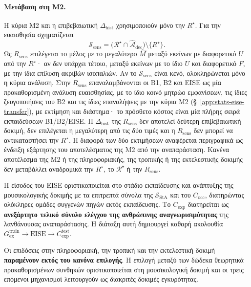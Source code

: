 \documentclass[11pt,a4paper]{article}
\begin{document}
\paragraph{Μετάβαση στη M2.}
Η κύρια M2 και η επιβεβαιωτική \(\Delta_{\mathrm{hist}}\) χρησιμοποιούν μόνο την \(R^\star\). Για την ευαισθησία σχηματίζεται
\[
\mathcal S_{\mathrm{sens}}=\bigl(\mathcal R^\star\cap\widehat{\mathcal A}_{\mathrm{dec}}\bigr)\setminus\{R^\star\}.
\]
Ως \(R_{\mathrm{sens}}\) επιλέγεται το μέλος με το μεγαλύτερο \(\widehat M\) μεταξύ εκείνων με διαφορετικό \(U\) από την \(R^\star\)· αν δεν υπάρχει τέτοιο, μεταξύ εκείνων με το ίδιο \(U\) και διαφορετικό \(F\), με την ίδια επίλυση ακριβών ισοπαλιών. Αν το \(\mathcal S_{\mathrm{sens}}\) είναι κενό, ολοκληρώνεται μόνο η κύρια ανάλυση. Στην \(R_{\mathrm{sens}}\) επαναλαμβάνονται οι B1, B2 και EISE ως μία προκαθορισμένη ανάλυση ευαισθησίας, με το ίδιο κοινό μητρώο εμφανίσεων, τις ίδιες ζευγοποιήσεις του B2 και τις ίδιες επαναλήψεις με την κύρια M2 (§~\ref{app:stats-eise-transfer}), με εκτίμηση και διάστημα· το πρόσθετο κόστος είναι μία πλήρης σειρά εκπαιδεύσεων B1/B2/EISE. Η \(\Delta_{\mathrm{hist}}\) της \(R_{\mathrm{sens}}\) δεν αποτελεί δεύτερη επιβεβαιωτική δοκιμή, δεν επιλέγεται η μεγαλύτερη από τις δύο τιμές και η \(R_{\mathrm{sens}}\) δεν μπορεί να αντικαταστήσει την \(R^\star\). Η διαφορά των δύο εκτιμήσεων αναφέρεται περιγραφικά ως ένδειξη εξάρτησης του αποτελέσματος της M2 από την αναπαράσταση. Κανένα αποτέλεσμα της M2 ή της πληροφοριακής, της τροπικής ή της εκτελεστικής δοκιμής δεν μεταβάλλει αναδρομικά την \(R^\star\), το \(\mathcal R^\star\) ή την \(R_{\mathrm{sens}}\).

Η είσοδος του EISE οριστικοποιείται στο στάδιο εκπαίδευσης και ανάπτυξης της μουσικολογικής δοκιμής με τα επιτρεπτά σύνολα της $\mathcal S_{\mathrm{StA}}$ και του $C_{\mathrm{occ}}$, διατηρώντας ολόκληρες ομάδες συγγενών πηγών εκτός εκπαίδευσης. Το $C_{\mathrm{exp}}$ διατηρείται ως \textbf{ανεξάρτητο τελικό σύνολο ελέγχου της ανθρώπινης αναγνωρισιμότητας} της λανθάνουσας αναπαράστασης. Η διάταξη αυτή δημιουργεί καθαρή ακολουθία $G_{\mathrm{ex}}^{\mathrm{train}}\rightarrow\mathrm{EISE}\rightarrow C_{\mathrm{exp}}^{\mathrm{test}}$.

Οι επιδόσεις στην πληροφοριακή, την τροπική και την εκτελεστική δοκιμή \textbf{παραμένουν εκτός του κανόνα επιλογής}. Η επιλογή μεταξύ των δώδεκα θεωρητικά προκαθορισμένων συνθηκών οριστικοποιείται στη μουσικολογική δοκιμή και οι τρεις επόμενοι μηχανισμοί λειτουργούν ως διακριτές δοκιμές εγκυρότητας.
\end{document}
